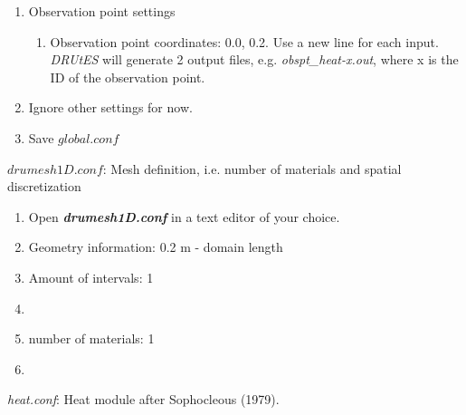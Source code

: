 \documentclass[
10pt, %
a4paper, %
oneside, %
headinclude,footinclude, %
BCOR5mm, %
]{scrartcl}
\begin{document}
\begin{enumerate}
\begin{enumerate}
\end{enumerate}
\item Observation point settings \begin{enumerate}
\item Observation point coordinates: 0.0, 0.2. Use a new line for each input. \textit{DRUtES} will generate 2 output files, e.g. \textit{obspt\_heat-x.out}, where x is the ID of the observation point. 
\end{enumerate}
\item Ignore other settings for now. 
\item Save $global.conf$
\end{enumerate}


$drumesh1D.conf$: Mesh definition, i.e. number of materials and spatial discretization
\begin{enumerate}
\item Open \textbf{\emph{drumesh1D.conf}} in a text editor of your choice. 
\item Geometry information: 0.2 m - domain length
\item Amount of intervals: 1
\item
{}
\item number of materials: 1
\item {}
\end{enumerate}

\emph{heat.conf}: Heat module after Sophocleous (1979). 
\end{document}
